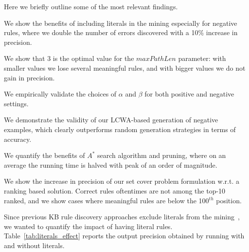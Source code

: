 Here we briefly outline some of the most relevant findings. 
\begin{inparaenum}[\itshape 1)]
	\item We show the benefits of including literals in the mining especially for negative rules, where we double the number of errors discovered with a 10\% increase in precision.
	\item We show that $3$ is the optimal value for the $maxPathLen$ parameter: with smaller values we lose several meaningful rules, and with bigger values we do not gain in precision.%
	\item We empirically validate the choices of $\alpha$ and $\beta$ for both positive and negative settings.
	\item We demonstrate the validity of our LCWA-based generation of negative examples, which clearly outperforms random generation strategies in terms of accuracy.
	\item We quantify the benefits of $A^*$ search algorithm and pruning, where on an average the running time is halved with peak of an order of magnitude.
	\item We show the increase in precision of our set cover problem formulation w.r.t. a ranking based solution. Correct rules oftentimes are not among the top-10 ranked, and we show cases where meaningful rules are below the 100$^{th}$ position.
	
\end{inparaenum}
%
Since previous KB rule discovery approaches exclude literals from the mining~\cite{abedjan2014amending,galarraga2015fast,Chen:2016}, we wanted to quantify the impact of having literal rules. Table~\ref{tab:literals_effect} reports the output precision obtained by running \krd with and without literals.
